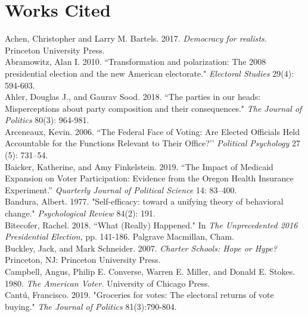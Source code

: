 \documentclass[12pt]{paper}
\begin{document}
\clearpage

\section*{Works Cited}
\singlespace 
\begin{hangparas}{.25in}{1}
Achen, Christopher and Larry M. Bartels. 2017. \textit{Democracy for realists.} Princeton University Press.
\\

Abramowitz, Alan I. 2010. ``Transformation and polarization: The 2008 presidential election and the new American electorate." \textit{Electoral Studies} 29(4): 594-603.
\\

Ahler, Douglas J., and Gaurav Sood. 2018. ``The parties in our heads: Misperceptions about party composition and their consequences." \textit{The Journal of Politics} 80(3): 964-981.
\\

Arceneaux, Kevin. 2006. ``The Federal Face of Voting: Are Elected Officials Held Accountable for the Functions Relevant to Their Office?’’ \textit{Political Psychology} 27 (5): 731–54.
\\

Baicker, Katherine, and Amy Finkelstein. 2019. “The Impact of Medicaid Expansion on Voter Participation: Evidence from the Oregon Health Insurance Experiment.” \textit{Quarterly Journal of Political Science} 14: 83–400.
\\

Bandura, Albert. 1977. "Self-efficacy: toward a unifying theory of behavioral change." \textit{Psychological Review} 84(2): 191.
\\

Bitecofer, Rachel. 2018. ``What (Really) Happened." In \textit{The Unprecedented 2016 Presidential Election,} pp. 141-186. Palgrave Macmillan, Cham.
\\

Buckley, Jack, and Mark Schneider. 2007. \textit{Charter Schools: Hope or Hype?} Princeton, NJ: Princeton University Press.
\\

Campbell, Angus, Philip E. Converse, Warren E. Miller, and Donald E. Stokes. 1980. \textit{The American Voter.} University of Chicago Press.
\\

Cantú, Francisco. 2019. "Groceries for votes: The electoral returns of vote buying." \textit{The Journal of Politics} 81(3):790-804.
\\


\end{hangparas}
\end{document}
